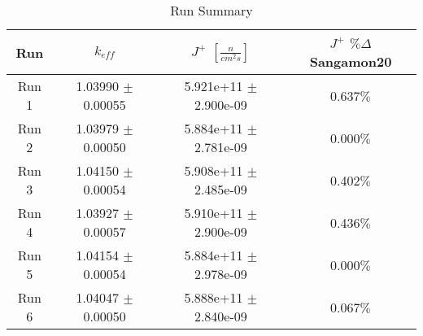 
\begin{table}[h!]
\centering
 \begin{tabularx}{0.7\textwidth}{c  c  c  c}
 	\hline
 	Run & $k_{eff}$ & $J^+$  $[\frac{n}{cm^2s}]$ & $J^+$ $\% \Delta$ Sangamon20  \\
 	\hline
 	Run 1 & 1.03990 $\pm$ 0.00055 & 5.921e+11 $\pm$ 2.900e-09 & 0.637$\%$ \\
 	Run 2 & 1.03979 $\pm$ 0.00050 & 5.884e+11 $\pm$ 2.781e-09 & 0.000$\%$ \\
 	Run 3 & 1.04150 $\pm$ 0.00054 & 5.908e+11 $\pm$ 2.485e-09 & 0.402$\%$ \\
 	Run 4 & 1.03927 $\pm$ 0.00057 & 5.910e+11 $\pm$ 2.900e-09 & 0.436$\%$ \\
 	Run 5 & 1.04154 $\pm$ 0.00054 & 5.884e+11 $\pm$ 2.978e-09 & 0.000$\%$ \\
 	Run 6 & 1.04047 $\pm$ 0.00050 & 5.888e+11 $\pm$ 2.840e-09 & 0.067$\%$ \\
 	\hline

 \end{tabularx}
\caption{Run Summary}
\label{table:slicesens}
\end{table}
